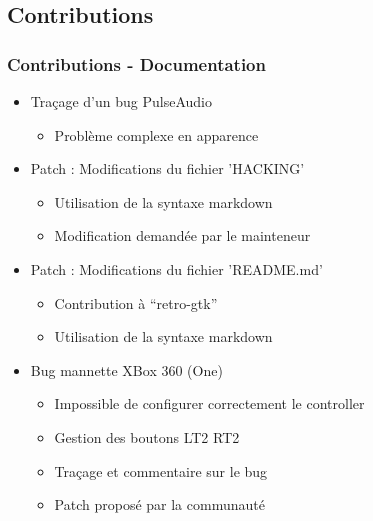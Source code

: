 \documentclass{beamer}
\begin{document}
\subsection{Contributions}
\begin{frame}
  \frametitle{Contributions - Documentation}
  \begin{itemize}
  \item Traçage d'un bug PulseAudio
    \begin{itemize}
      \item Problème complexe en apparence
    \end{itemize}
  \item Patch : Modifications du fichier 'HACKING'
    \begin{itemize}
    \item Utilisation de la syntaxe markdown
    \item Modification demandée par le mainteneur
    \end{itemize}
  \item Patch : Modifications du fichier 'README.md'
    \begin{itemize}
    \item Contribution à ``retro-gtk''
    \item Utilisation de la syntaxe markdown
    \end{itemize}
  \item Bug mannette XBox 360 (One)
    \begin{itemize}
    \item Impossible de configurer correctement le controller
    \item Gestion des boutons LT2 RT2
    \item Traçage et commentaire sur le bug
    \item Patch proposé par la communauté
    \end{itemize}
  \end{itemize}
\end{frame}
\end{document}
